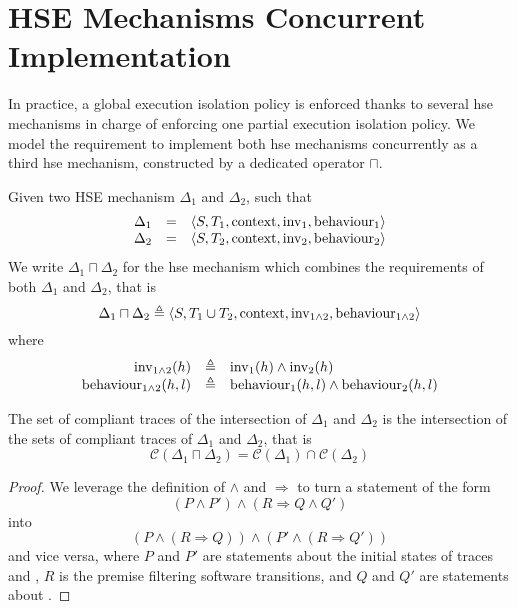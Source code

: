 \section{HSE Mechanisms Concurrent Implementation}
\label{subsec:speccert:coop}

In practice, a global execution isolation policy is enforced thanks to several
\ac{hse} mechanisms in charge of enforcing one partial execution isolation
policy.
%
We model the requirement to implement both \ac{hse} mechanisms concurrently as a
third \ac{hse} mechanism, constructed by a dedicated operator $\sqcap$.

\begin{definition}
  Given two HSE mechanism $\Delta_1$ and $\Delta_2$, such that
%
  \[
    \begin{array}{rcl}
      \Delta_1
      & =
      & \langle S, T_1, \mathrm{context}, \mathrm{inv}_1, \mathrm{behaviour}_1
        \rangle \\
      \Delta_2
      & =
      & \langle S, T_2, \mathrm{context}, \mathrm{inv}_2, \mathrm{behaviour}_2
        \rangle
    \end{array}
  \]
%
  We write $\Delta_1 \sqcap \Delta_2$ for the \ac{hse} mechanism which combines
  the requirements of both $\Delta_1$ and $\Delta_2$, that is
%
  \[
    \Delta_1 \sqcap \Delta_2 \triangleq \langle S, T_1 \cup T_2, \mathrm{context},
    \mathrm{inv}_{1\wedge2}, \mathrm{behaviour}_{1\wedge2} \rangle
  \]
%
  where
  \[
    \begin{array}{rcl}
      \mathrm{inv}_{1\wedge2}(h)
      & \triangleq
      & \mathrm{inv}_1(h) \wedge \mathrm{inv}_2(h) \\
      \mathrm{behaviour}_{1\wedge2}(h,l)
      & \triangleq
      & \mathrm{behaviour}_1(h,l) \wedge \mathrm{behaviour}_2(h,l)
    \end{array}
  \]
\end{definition}

\begin{lemma}
  \label{lemma:speccert:compinter}
  The set of compliant traces of the intersection of $\Delta_1$ and $\Delta_2$
  is the intersection of the sets of compliant traces of $\Delta_1$ and
  $\Delta_2$, that is
  \[
    \mathcal{C}(\Delta_1 \sqcap \Delta_2) = \mathcal{C}(\Delta_1) \cap
    \mathcal{C}(\Delta_2)
  \]

  \begin{proof}
    We leverage the definition of $\wedge$ and $\Rightarrow$ to turn a statement
    of the form
    \[
      (P \wedge P') \wedge (R \Rightarrow Q \wedge Q')
    \]
    into
    \[
      (P \wedge (R \Rightarrow Q)) \wedge (P' \wedge (R \Rightarrow Q'))
    \]
    and vice versa, where $P$ and $P'$ are statements about the initial states
    of traces and , $R$ is the premise filtering software transitions,
    and $Q$ and $Q'$ are statements about .
  \end{proof}
\end{lemma}

